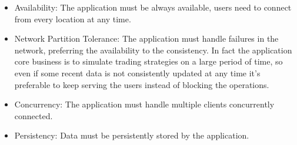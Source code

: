 \begin{itemize}
	\item Availability: The application must be always available, users need to connect from every location at any time.
	\item Network Partition Tolerance: The application must handle failures in the network, preferring the availability to the consistency. In fact the application core business is to simulate trading strategies on a large period of time, so even if some recent data is not consistently updated at any time it's preferable to keep serving the users instead of blocking the operations. 
	\item Concurrency: The application must handle multiple clients concurrently connected.
	\item Persistency: Data must be persistently stored by the application.
\end{itemize}
